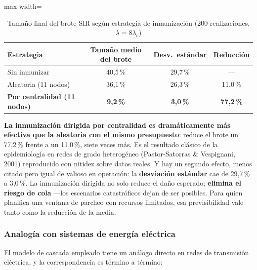\documentclass[10pt,a4paper]{extarticle}
\begin{document}
\begin{table}[H]
\centering
\caption{Tamaño final del brote SIR según estrategia de inmunización (200 realizaciones, $\lambda = 8\lambda_c$)}
\label{tab:inmunizacion}
\small
\begin{adjustbox}{max width=\textwidth}
\begin{tabular}{lccc}
\toprule
\textbf{Estrategia} & \textbf{Tamaño medio del brote} & \textbf{Desv.\ estándar} & \textbf{Reducción} \\
\midrule
Sin inmunizar                    & 40,5\,\% & 29,7\,\% & --- \\
Aleatoria (11 nodos)             & 36,1\,\% & 26,3\,\% & 11,0\,\% \\
\textbf{Por centralidad (11 nodos)} & \textbf{9,2\,\%} & \textbf{3,0\,\%} & \textbf{77,2\,\%} \\
\bottomrule
\end{tabular}
\end{adjustbox}
\end{table}

\textbf{La inmunización dirigida por centralidad es dramáticamente más efectiva que la
aleatoria con el mismo presupuesto}: reduce el brote un 77,2\,\% frente a un 11,0\,\%, siete
veces más. Es el resultado clásico de la epidemiología en redes de grado heterogéneo
(Pastor-Satorras \& Vespignani, 2001) reproducido con nitidez sobre datos reales. Y hay un
segundo efecto, menos citado pero igual de valioso en operación: la \textbf{desviación
estándar} cae de 29,7\,\% a 3,0\,\%. La inmunización dirigida no solo reduce el daño
esperado; \textbf{elimina el riesgo de cola} ---los escenarios catastróficos dejan de ser
posibles. Para quien planifica una ventana de parcheo con recursos limitados, esa
previsibilidad vale tanto como la reducción de la media.

\subsubsection{Analogía con sistemas de energía eléctrica}

El modelo de cascada empleado tiene un análogo directo en redes de transmisión eléctrica, y
la correspondencia es término a término:
\end{document}
